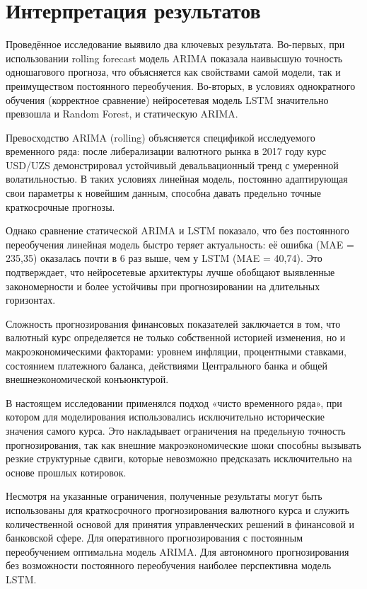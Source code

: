 \section{Интерпретация результатов}
Проведённое исследование выявило два ключевых результата. Во-первых, при использовании rolling forecast модель ARIMA показала наивысшую точность одношагового прогноза, что объясняется как свойствами самой модели, так и преимуществом постоянного переобучения. Во-вторых, в условиях однократного обучения (корректное сравнение) нейросетевая модель LSTM значительно превзошла и Random Forest, и статическую ARIMA.

Превосходство ARIMA (rolling) объясняется спецификой исследуемого временного ряда: после либерализации валютного рынка в 2017 году курс USD/UZS демонстрировал устойчивый девальвационный тренд с умеренной волатильностью. В таких условиях линейная модель, постоянно адаптирующая свои параметры к новейшим данным, способна давать предельно точные краткосрочные прогнозы.

Однако сравнение статической ARIMA и LSTM показало, что без постоянного переобучения линейная модель быстро теряет актуальность: её ошибка (MAE = 235,35) оказалась почти в 6 раз выше, чем у LSTM (MAE = 40,74). Это подтверждает, что нейросетевые архитектуры лучше обобщают выявленные закономерности и более устойчивы при прогнозировании на длительных горизонтах.

Сложность прогнозирования финансовых показателей заключается в том, что валютный курс определяется не только собственной историей изменения, но и макроэкономическими факторами: уровнем инфляции, процентными ставками, состоянием платежного баланса, действиями Центрального банка и общей внешнеэкономической конъюнктурой.

В настоящем исследовании применялся подход «чисто временного ряда», при котором для моделирования использовались исключительно исторические значения самого курса. Это накладывает ограничения на предельную точность прогнозирования, так как внешние макроэкономические шоки способны вызывать резкие структурные сдвиги, которые невозможно предсказать исключительно на основе прошлых котировок.

Несмотря на указанные ограничения, полученные результаты могут быть использованы для краткосрочного прогнозирования валютного курса и служить количественной основой для принятия управленческих решений в финансовой и банковской сфере. Для оперативного прогнозирования с постоянным переобучением оптимальна модель ARIMA. Для автономного прогнозирования без возможности постоянного переобучения наиболее перспективна модель LSTM.


